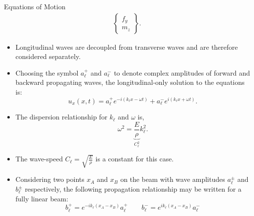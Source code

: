 \documentclass[aspectratio=169]{beamertmd}
\begin{document}
\begin{frame}[allowframebreaks]
\begin{block}{Equations of Motion}
{\begin{align*}
\begin{Bmatrix}
          f_y\\ m_z\end{Bmatrix}. 
      \end{align*}}
  \end{block}
  \begin{itemize}
  \item Longitudinal waves are decoupled from transverse waves and are
    therefore considered separately.
  \item Choosing the symbol $a_\ell^+$ and $a_\ell^-$ to denote complex
    amplitudes of forward and backward propagating waves, the
    longitudinal-only solution to the equations is:
    $$ u_x(x, t) = a_\ell^+ e^{-i(k_\ell x-\omega t)} + a_\ell^-
    e^{i(k_\ell x+\omega t)}. $$
  \item The dispersion relationship for $k_\ell$ and $\omega$ is,
    $$ \omega^2 = \underbrace{\frac{E}{\rho}}_{C_\ell^2} k_\ell^2. $$
  \item The wave-speed $C_\ell=\sqrt{\frac{E}{\rho}}$ is a constant
    for this case.
  \item Considering two points $x_A$ and $x_B$ on the beam with wave
    amplitudes $a_\ell^\pm$ and $b_\ell^\pm$ respectively, the
    following propagation relationship may be written for a fully
    linear beam:
    $$ b_{\ell}^+ = e^{-ik_{\ell}(x_A-x_B)} a_{\ell}^+\qquad
    b_{\ell}^- = e^{ik_{\ell}(x_A-x_B)} a_{\ell}^- $$
  \end{itemize}
\end{frame}
\end{document}
